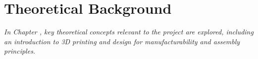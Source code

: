 \chapter{Theoretical Background}
\label{chapter:theoretical-background}

\textit{In Chapter \thechapter, key theoretical concepts relevant to the project are explored, including an introduction to 3D printing and design for manufacturability and assembly principles.}


